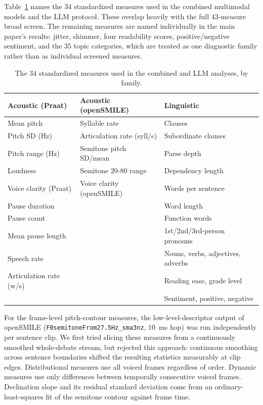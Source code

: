 \documentclass[pdflatex,sn-apa]{sn-jnl}%
\begin{document}
Table~\ref{s:tab:featuredict} names the $34$ standardized measures used in
the combined multimodal models and the LLM protocol. These overlap heavily
with the full $43$-measure broad screen. The remaining measures are named
individually in the main paper's results: jitter, shimmer, four readability
scores, positive/negative sentiment, and the $35$ topic categories, which
are treated as one diagnostic family rather than as individual screened
measures.

\begin{table}[!htbp]
\caption{The $34$ standardized measures used in the combined and LLM
analyses, by family.}
\label{s:tab:featuredict}
\centering
\scriptsize
\setlength{\tabcolsep}{2pt}
\begin{tabular}{p{}p{}p{}}
\toprule
Acoustic (Praat) & Acoustic (openSMILE) & Linguistic \\
\midrule
Mean pitch & Syllable rate & Clauses \\
Pitch SD (Hz) & Articulation rate (syll/s) & Subordinate clauses \\
Pitch range (Hz) & Semitone pitch SD/mean & Parse depth \\
Loudness & Semitone $20$-$80$ range & Dependency length \\
Voice clarity (Praat) & Voice clarity (openSMILE) & Words per sentence \\
Pause duration & & Word length \\
Pause count & & Function words \\
Mean pause length & & 1st/2nd/3rd-person pronouns \\
Speech rate & & Nouns, verbs, adjectives, adverbs \\
Articulation rate (w/s) & & Reading ease, grade level \\
 & & Sentiment, positive, negative \\
\bottomrule
\end{tabular}
\end{table}

For the frame-level pitch-contour measures, the low-level-descriptor output
of openSMILE (\texttt{F0semitoneFrom27.5Hz\_sma3nz}, $10$~ms hop) was run
independently per sentence clip. We first tried slicing these measures from
a continuously smoothed whole-debate stream, but rejected this approach:
continuous smoothing across sentence boundaries shifted the resulting
statistics measurably at clip edges. Distributional measures use all
voiced frames regardless of order. Dynamic measures use only differences
between temporally consecutive voiced frames. Declination slope and its
residual standard deviation come from an ordinary-least-squares fit of the
semitone contour against frame time.
\end{document}
